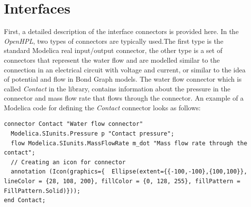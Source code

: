 \documentclass[%
]{USN-PhD}
\begin{document}
\section{Interfaces}

First, a detailed description of the interface connectors is provided here. In the \emph{OpenHPL}, two types of connectors are typically used.The first type is the standard Modelica real input/output connector, the other type is a set of connectors that represent the water flow and are modelled similar to the connection in an electrical circuit with voltage and current, or similar to the idea of potential and flow in Bond Graph models. The water flow connector which is called \emph{Contact} in the library, contains information about the pressure in the connector and mass flow rate that flows through the connector. An example of a Modelica code for defining the \emph{Contact} connector looks as follows:

\begin{lstlisting}[language = modelica]
connector Contact "Water flow connector"
  Modelica.SIunits.Pressure p "Contact pressure";
  flow Modelica.SIunits.MassFlowRate m_dot "Mass flow rate through the contact";
  // Creating an icon for connector
  annotation (Icon(graphics={  Ellipse(extent={{-100,-100},{100,100}}, lineColor = {28, 108, 200}, fillColor = {0, 128, 255}, fillPattern = FillPattern.Solid)}));
end Contact;
\end{lstlisting}
\end{document}
